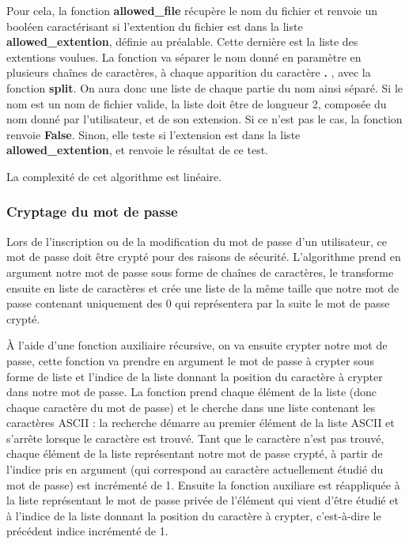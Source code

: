 \documentclass{article}
\begin{document}
Pour cela, la fonction \textbf{allowed\_file} récupère le nom du fichier et renvoie un booléen caractérisant si l'extention du fichier est dans la liste \textbf{allowed\_extention}, définie au préalable. Cette dernière est la liste des extentions voulues. La fonction va séparer le nom donné en paramètre en plusieurs chaînes de caractères, à chaque apparition du caractère \textbf{.} ,  avec la fonction \textbf{split}. On aura donc une liste de chaque partie du nom ainsi séparé. Si le nom est un nom de fichier valide, la liste doit être de longueur 2, composée du nom donné par l'utilisateur, et de son extension. Si ce n'est pas le cas, la fonction renvoie \textbf{False}. Sinon, elle teste si l'extension est dans la liste \textbf{allowed\_extention}, et renvoie le résultat de ce test.

La complexité de cet algorithme est linéaire.

\newpage
\subsubsection{Cryptage du mot de passe}
Lors de l'inscription ou de la modification du mot de passe d'un utilisateur, ce mot de passe doit être crypté pour des raisons de sécurité. L'algorithme prend en argument notre mot de passe sous forme de chaînes de caractères, le transforme ensuite en liste de caractères et crée une liste de la même taille que notre mot de passe contenant uniquement des 0 qui représentera par la suite le mot de passe crypté. 

À l'aide d'une fonction auxiliaire récursive, on va ensuite crypter notre mot de passe, cette fonction va prendre en argument le mot de passe à crypter sous forme de liste et l'indice de la liste donnant la position du caractère à crypter dans notre mot de passe. La fonction prend chaque élément de la liste (donc chaque caractère du mot de passe) et le cherche dans une liste contenant les caractères ASCII : la recherche démarre au premier élément de la liste ASCII et s'arrête lorsque le caractère est trouvé. Tant que le caractère n'est pas trouvé, chaque élément de la liste représentant notre mot de passe crypté, à partir de l'indice pris en argument (qui correspond au caractère actuellement étudié du mot de passe) est incrémenté de 1. Ensuite la fonction auxiliare est réappliquée à la liste représentant le mot de passe privée de l'élément qui vient d'être étudié et à l'indice de la liste donnant la position du caractère à crypter, c'est-à-dire le précédent indice incrémenté de 1. 
\end{document}
